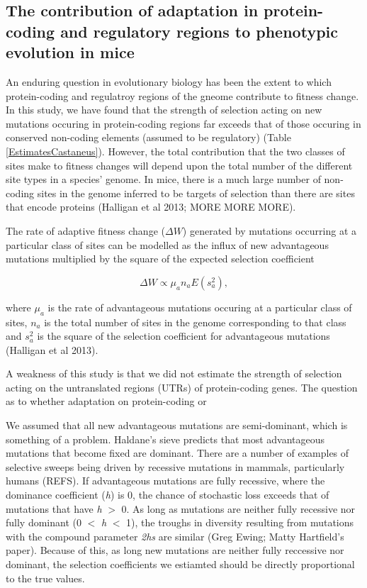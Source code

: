 \documentclass[11pt]{article}
\begin{document}
\subsection*{The contribution of adaptation in protein-coding and regulatory regions to phenotypic evolution in mice}

An enduring question in evolutionary biology has been the extent to which protein-coding and regulatroy regions of the gneome contribute to fitness change. In this study, we have found that the strength of selection acting on new mutations occuring in protein-coding regions far exceeds that of those occuring in conserved non-coding elements (assumed to be regulatory) (Table \ref{EstimatesCastaneus}). However, the total contribution that the two classes of sites make to fitness changes will depend upon the total number of the different site types in a species' genome. In mice, there is a much large number of non-coding sites in the genome inferred to be targets of selection than there are sites that encode proteins (Halligan et al 2013; MORE MORE MORE). 


The rate of adaptive fitness change ($\Delta W$) generated by mutations occurring at a particular class of sites can be modelled as the influx of new advantageous mutations multiplied by the square of the expected selection coefficient

\begin{equation}
\label{eq:fitness}
\Delta W \propto \mu_a n_a E(s_a^2),
\end{equation}

where $\mu_a$ is the rate of advantageous mutations occuring at a particular class of sites, \textit{$n_a$} is the total number of sites in the genome corresponding to that class and \textit{$s_a^2$} is the square of the selection coefficient for advantageous mutations (Halligan et al 2013). 



A weakness of this study is that we did not estimate the strength of selection acting on the untranslated regions (UTRs) of protein-coding genes. The question as to whether adaptation on protein-coding or 

We assumed that all new advantageous mutations are semi-dominant, which is something of a problem. Haldane's sieve predicts that most advantageous mutations that become fixed are dominant. There are a number of examples of selective sweeps being driven by recessive mutations in mammals, particularly humans (REFS). If advantageous mutations are fully recessive, where the dominance coefficient (\textit{h}) is 0, the chance of stochastic loss exceeds that of mutations that have \textit{h} $>$ 0. As long as mutations are neither fully recessive nor fully dominant (0 $<$ \textit{h} $<$ 1), the troughs in diversity resulting from mutations with the compound parameter \textit{2hs} are similar (Greg Ewing; Matty Hartfield's paper). Because of this, as long new mutations are neither fully reccessive nor dominant, the selection coefficients we estiamted should be directly proportional to the true values.
\end{document}

